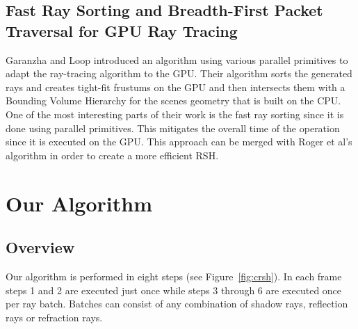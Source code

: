 \documentclass{egpubl}
\begin{document}
\subsection{Fast Ray Sorting and Breadth-First Packet Traversal for GPU Ray Tracing}

Garanzha and Loop \cite{Garanzha10} introduced an algorithm using various parallel primitives to adapt the ray-tracing algorithm to the GPU. Their algorithm sorts the generated rays and creates tight-fit frustums on the GPU and then intersects them with a Bounding Volume Hierarchy for the scenes geometry that is built on the CPU. One of the most interesting parts of their work is the fast ray sorting since it is done using parallel primitives. This mitigates the overall time of the operation since it is executed on the GPU. This approach can be merged with Roger et al's \cite{Roger07} algorithm in order to create a more efficient RSH.


\section{Our Algorithm} 

\subsection{Overview}

Our algorithm is performed in eight steps (see Figure~\ref{fig:crsh}). In each frame steps 1 and 2 are executed just once while steps 3 through 6 are executed once per ray batch. Batches can consist of any combination of shadow rays, reflection rays or refraction rays.
\end{document}
